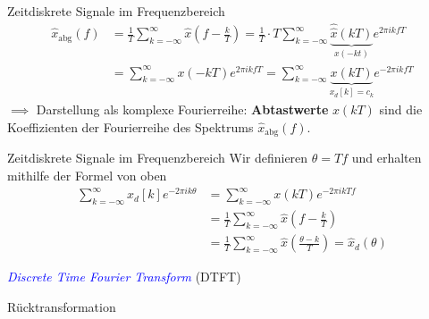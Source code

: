 \documentclass[14pt, aspectratio=169, handout]{beamer}
\begin{document}
\begin{frame}{Zeitdiskrete Signale im Frequenzbereich}
    \begin{align*}
        \hat{x}_{\text{abg}}(f) &= \frac{1}{T}\sum_{k=-\infty}^{\infty}\hat{x}\left( f- \frac{k}{T} \right) = \frac{1}{T}\cdot T \sum_{k=-\infty}^{\infty} \underbrace{\hat{\hat{x}}(kT)}_{x(-kt)}e^{2 \pi i k f T} \\
        &= \sum_{k=-\infty}^\infty x(-kT)e^{2 \pi i k f T} = \sum_{k=-\infty}^\infty \underbrace{x(kT)}_{x_d[k]=c_k}e^{-2 \pi i k f T}
    \end{align*}
$\implies$ Darstellung als komplexe Fourierreihe: \textbf{Abtastwerte} $x(kT)$ sind die Koeffizienten der Fourierreihe des Spektrums $\hat{x}_{\text{abg}}(f)$.
\end{frame}

\begin{frame}{Zeitdiskrete Signale im Frequenzbereich}
    Wir definieren $\theta = Tf$ und erhalten mithilfe der Formel von oben
    \begin{align*}
        \sum_{k=-\infty}^\infty x_d[k] e^{-2\pi i k \theta} &= \sum_{k=-\infty}^\infty x(kT) e^{-2\pi i k T f} \\
        &= \frac{1}{T}\sum_{k=-\infty}^{\infty}\hat{x}\left( f- \frac{k}{T} \right) \\
        &= \frac{1}{T}\sum_{k=-\infty}^{\infty}\hat{x}\left( \frac{\theta - k}{T} \right) = \hat{x}_d(\theta)
    \end{align*}
\end{frame}

\begin{frame}{\textcolor{blue}{\textit{Discrete Time Fourier Transform}} (DTFT)}
\end{frame}

\begin{frame}{Rücktransformation}

\end{frame}
\end{document}
